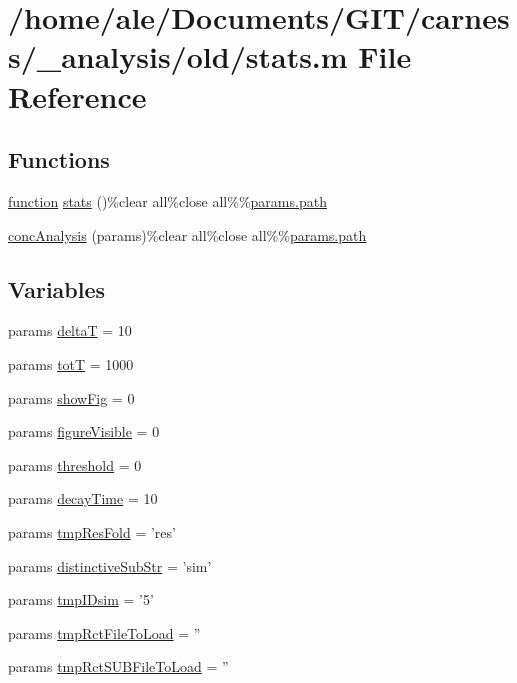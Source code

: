\hypertarget{a00030}{\section{/home/ale/\-Documents/\-G\-I\-T/carness/\-\_\-analysis/old/stats.m File Reference}
\label{a00030}
}
\subsection*{Functions}
\begin{DoxyCompactItemize}
\item 
\hyperlink{a00062_a4b4c670b101bf7a838f775e008fa6255}{function} \hyperlink{a00030_aa7ae495ee970be20d992bedf6f9f8280}{stats} ()\%clear all\%close all\%\%\hyperlink{a00065_af28466084b87af2cdc5c7b48f4661f2d}{params.\-path}
\item 
\hyperlink{a00030_a18a344cbdf9b3218a438bca78547ab9e}{conc\-Analysis} (params)\%clear all\%close all\%\%\hyperlink{a00065_af28466084b87af2cdc5c7b48f4661f2d}{params.\-path}
\end{DoxyCompactItemize}
\subsection*{Variables}
\begin{DoxyCompactItemize}
\item 
params \hyperlink{a00030_a5318eae09f2b8ac76b2d6df39ba9c1cd}{delta\-T} = 10
\item 
params \hyperlink{a00030_aa9758857dd92f7845934f06daa7c4120}{tot\-T} = 1000
\item 
params \hyperlink{a00030_a4b295f592934e78a05958a54046ceb68}{show\-Fig} = 0
\item 
params \hyperlink{a00030_a63b4c2789d7e1513024181d12e4f1b6b}{figure\-Visible} = 0
\item 
params \hyperlink{a00030_aa022cbb28f80299d572def08e7a5ccfd}{threshold} = 0
\item 
params \hyperlink{a00030_afb6aa83fb78c663f3b39be2380842a8b}{decay\-Time} = 10
\item 
params \hyperlink{a00030_a4e4b89515d35d0cba5873e282e55dc8c}{tmp\-Res\-Fold} = 'res'
\item 
params \hyperlink{a00030_ab3d8fca9a15f5a064b07181a35ebdbb7}{distinctive\-Sub\-Str} = 'sim'
\item 
params \hyperlink{a00030_a71a9d71e2c994a7a8552d39b41b6e256}{tmp\-I\-Dsim} = '5'
\item 
params \hyperlink{a00030_a3b01c97f207a2997c3bd0c2718441509}{tmp\-Rct\-File\-To\-Load} = ''
\item 
params \hyperlink{a00030_ae5d21adddbfe36d5b10d43a2e8b39123}{tmp\-Rct\-S\-U\-B\-File\-To\-Load} = ''
\end{DoxyCompactItemize}


